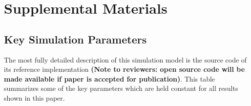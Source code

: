 \documentclass[acmtog]{acmart}
\begin{document}

\appendix
\newpage
\onecolumn
\section{Supplemental Materials}

\subsection{Key Simulation Parameters}
The most fully detailed description of this simulation model is the source code of its reference implementation \textbf{(Note to reviewers: open source code will be made available if paper is accepted for publication)}. This table summarizes some of the key parameters which are held constant for all results shown in this paper.
\par
\end{document}

